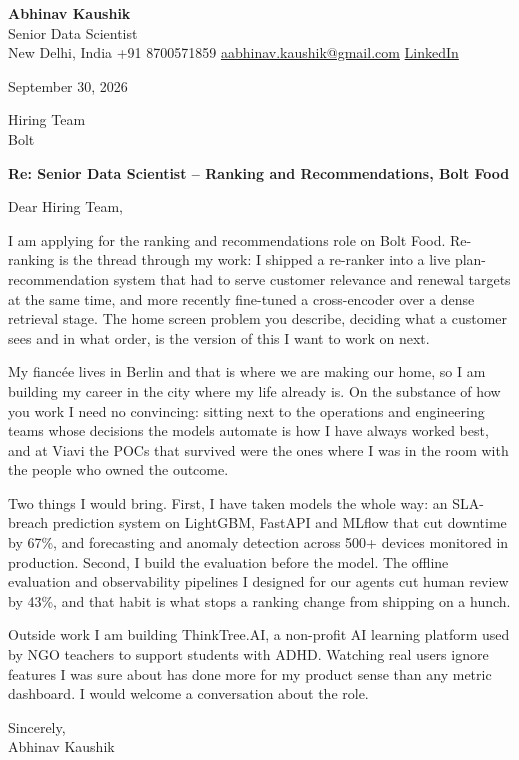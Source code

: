 \documentclass[11pt,a4paper]{article}
\begin{document}
{\Large\bfseries Abhinav Kaushik}\\
Senior Data Scientist\\
New Delhi, India \textbar{} +91 8700571859 \textbar{} \href{mailto:aabhinav.kaushik@gmail.com}{aabhinav.kaushik@gmail.com} \textbar{} \href{https://www.linkedin.com/in/abhinav-kaushik10/}{LinkedIn}

September 30, 2026

Hiring Team\\
Bolt

\textbf{Re: Senior Data Scientist -- Ranking and Recommendations, Bolt Food}

Dear Hiring Team,

I am applying for the ranking and recommendations role on Bolt Food. Re-ranking is the thread through my work: I shipped a re-ranker into a live plan-recommendation system that had to serve customer relevance and renewal targets at the same time, and more recently fine-tuned a cross-encoder over a dense retrieval stage. The home screen problem you describe, deciding what a customer sees and in what order, is the version of this I want to work on next.

My fiancée lives in Berlin and that is where we are making our home, so I am building my career in the city where my life already is. On the substance of how you work I need no convincing: sitting next to the operations and engineering teams whose decisions the models automate is how I have always worked best, and at Viavi the POCs that survived were the ones where I was in the room with the people who owned the outcome.

Two things I would bring. First, I have taken models the whole way: an SLA-breach prediction system on LightGBM, FastAPI and MLflow that cut downtime by 67\%, and forecasting and anomaly detection across 500+ devices monitored in production. Second, I build the evaluation before the model. The offline evaluation and observability pipelines I designed for our agents cut human review by 43\%, and that habit is what stops a ranking change from shipping on a hunch.

Outside work I am building ThinkTree.AI, a non-profit AI learning platform used by NGO teachers to support students with ADHD. Watching real users ignore features I was sure about has done more for my product sense than any metric dashboard. I would welcome a conversation about the role.

Sincerely,\\[4pt]
Abhinav Kaushik
\end{document}

